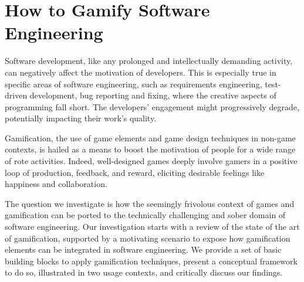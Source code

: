 
\chapter{How to Gamify Software Engineering}\label{ch:gamification}

Software development, like any prolonged and intellectually demanding activity, can negatively affect the motivation of developers.
This is especially true in specific areas of software engineering, such as requirements engineering, test-driven development, bug reporting and fixing, where the creative aspects of programming fall short.
The developers' engagement might progressively degrade, potentially impacting their work's quality.

Gamification, the use of game elements and game design techniques in non-game contexts, is hailed as a means to boost the motivation of people for a wide range of rote activities.
Indeed, well-designed games deeply involve gamers in a positive loop of production, feedback, and reward, eliciting desirable feelings like happiness and collaboration.

The question we investigate is how the seemingly frivolous context of games and gamification can be ported to the technically challenging and sober domain of software engineering.
Our investigation starts with a review of the state of the art of gamification, supported by a motivating scenario to expose how gamification elements can be integrated in software engineering.
We provide a set of basic building blocks to apply gamification techniques, present a conceptual framework to do so, illustrated in two usage contexts, and critically discuss our findings.

\structure

